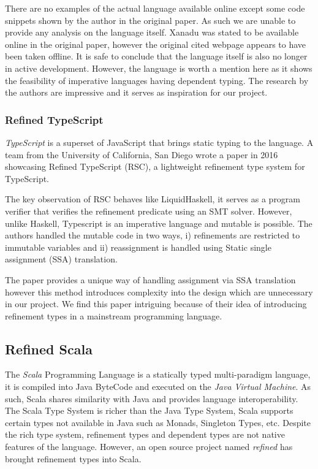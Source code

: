 \documentclass[a4paper,12pt]{report}
\begin{document}
\par
There are no examples of the actual language available online except some code 
snippets shown by the author in the original paper. As such we are unable to 
provide any analysis on the language itself. Xanadu was stated to be available 
online in the original paper, however the original cited webpage  
appears to have been taken offline. It is safe to conclude that the 
language itself is also no longer in active development. However, the 
language is worth a mention here as it shows the feasibility of 
imperative languages having dependent typing. The research by the authors 
are impressive and it serves as inspiration for our project. 

\subsubsection{Refined TypeScript}
\textit{TypeScript} is a superset of JavaScript that brings static typing to the 
language. A team from the University of California, San Diego wrote a paper \cite{rts} 
in 2016 showcasing Refined TypeScript (RSC), a lightweight refinement type 
system for TypeScript. 

\par
The key observation of RSC behaves like LiquidHaskell, it serves as a program 
verifier that verifies the refinement predicate using an SMT solver. However, 
unlike Haskell, Typescript is an imperative language and mutable is possible. 
The authors handled the mutable code in two ways, i) refinements are 
restricted to immutable variables and ii) reassignment is handled using 
Static single assignment (SSA) translation.

\par
The paper provides a unique way of handling assignment via SSA translation 
however this method introduces complexity into the design which are unnecessary 
in our project. We find this paper intriguing because of their idea of 
introducing refinement types in a mainstream programming language. 

\subsection{Refined Scala}
The \textit{Scala} \cite{scala} Programming Language is a statically 
typed multi-paradigm language, it is compiled into Java ByteCode and 
executed on the \textit{Java Virtual Machine}. 
As such, Scala shares similarity with Java and provides language 
interoperability. The Scala Type System is richer than the Java Type System, 
Scala supports certain types not available in Java such as Monads, 
Singleton Types, etc. Despite the rich type system, refinement types and dependent 
types are not native features of the language. However, an open source project 
named \textit{refined} \cite{refinedScala} has brought refinement types into Scala. 
\end{document}
